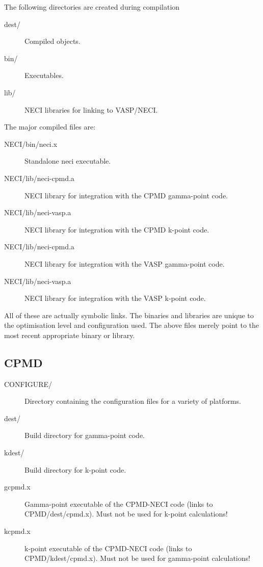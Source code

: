 \documentclass[openany,a4paper,10pt,english]{manual}
\begin{document}
The following directories are created during compilation
\begin{description}
\item[dest/] \leavevmode
Compiled objects.

\item[bin/] \leavevmode
Executables.

\item[lib/] \leavevmode
NECI libraries for linking to VASP/NECI.

\end{description}

The major compiled files are:
\begin{description}
\item[NECI/bin/neci.x] \leavevmode
Standalone neci executable.

\item[NECI/lib/neci-cpmd.a] \leavevmode
NECI library for integration with the CPMD gamma-point code.

\item[NECI/lib/neci-vasp.a] \leavevmode
NECI library for integration with the CPMD k-point code.

\item[NECI/lib/neci-cpmd.a] \leavevmode
NECI library for integration with the VASP gamma-point code.

\item[NECI/lib/neci-vasp.a] \leavevmode
NECI library for integration with the VASP k-point code.

\end{description}

All of these are actually symbolic links.  The binaries and libraries are
unique to the optimisation level and configuration used.  The above files
merely point to the most recent appropriate binary or library.


\subsection{CPMD}
\begin{description}
\item[CONFIGURE/] \leavevmode
Directory containing the configuration files for a variety of platforms.

\item[dest/] \leavevmode
Build directory for gamma-point code.

\item[kdest/] \leavevmode
Build directory for k-point code.

\item[gcpmd.x] \leavevmode
Gamma-point executable of the CPMD-NECI code (links to CPMD/dest/cpmd.x).
Must not be used for k-point calculations!

\item[kcpmd.x] \leavevmode
k-point executable of the CPMD-NECI code (links to CPMD/kdest/cpmd.x).
Must not be used for gamma-point calculations!

\end{description}
\end{document}
